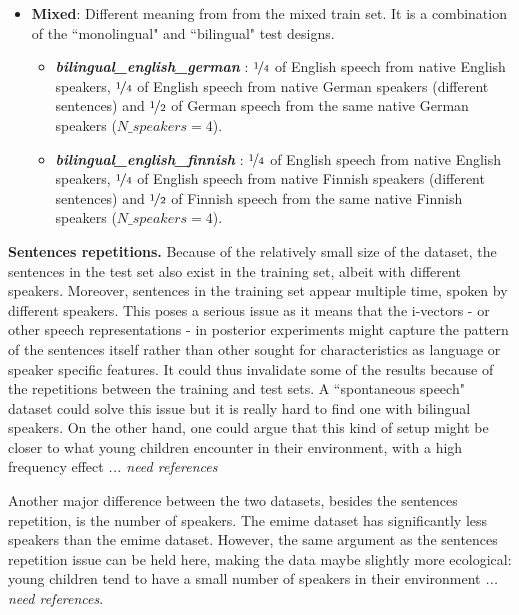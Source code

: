 \begin{itemize}[itemsep=2pt,topsep=4pt,itemindent=4pt]
\begin{itemize}[itemsep=1pt,topsep=2pt]
        \end{itemize}
    \item \textbf{Mixed}: Different meaning from from the mixed train set. It is a combination of the ``monolingual" and ``bilingual" test designs. 
        \begin{itemize}[itemsep=1pt,topsep=2pt]
        \renewcommand\labelitemi{--}
        \item \textbf{\textit{bilingual\_english\_german}} : $\nicefrac{1}{4}$ of English speech from native English speakers, $\nicefrac{1}{4}$ of English speech from native German speakers (different sentences) and $\nicefrac{1}{2}$ of German speech from the same native German speakers ($N\_speakers=4$).
        \item \textbf{\textit{bilingual\_english\_finnish}} : $\nicefrac{1}{4}$ of English speech from native English speakers, $\nicefrac{1}{4}$ of English speech from native Finnish speakers (different sentences) and $\nicefrac{1}{2}$ of Finnish speech from the same native Finnish speakers ($N\_speakers=4$).
        \end{itemize}
\end{itemize}

\bigskip

\par \noindent \danger \hspace{0.1cm} \textbf{Sentences repetitions.} Because of the relatively small size of the dataset, the sentences in the test set also exist in the training set, albeit with different speakers. Moreover, sentences in the training set appear multiple time, spoken by different speakers.  This poses a serious issue as it means that the i-vectors  - or other speech representations - in posterior experiments might capture the pattern of the sentences itself rather than other sought for characteristics as language or speaker specific features. It could thus invalidate some of the results because of the repetitions between the training and test sets. A ``spontaneous speech" dataset could solve this issue but it is really hard to find one with bilingual speakers. On the other hand, one could argue that this kind of setup might be closer to what young children encounter in their environment, with a high frequency effect \textit{... need references}

\bigskip

Another major difference between the two datasets, besides the sentences repetition, is the number of speakers. The \acrshort{emime} dataset has significantly less speakers than the \acrshort{emime} dataset. However, the same argument as the sentences repetition issue can be held here, making the data maybe slightly more ecological: young children tend to have a small number of speakers in their environment \textit{... need references}.


